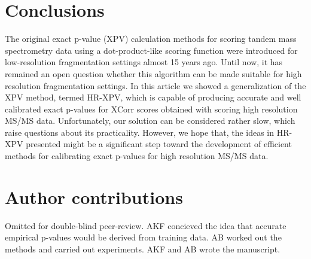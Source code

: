 \documentclass{article}
\begin{document}
%

\section{Conclusions}
The original exact p-value (XPV) calculation methods for scoring tandem mass spectrometry data using a dot-product-like scoring function were introduced for low-resolution fragmentation settings almost 15 years ago. Until now, it has remained an open question whether this algorithm can be made suitable for high resolution fragmentation settings. In this article we showed a generalization of the XPV method, termed HR-XPV, which is capable of producing accurate and well calibrated exact p-values for XCorr scores obtained with scoring high resolution MS/MS data. Unfortunately, our solution can be considered rather slow, which raise questions about its practicality. However, we hope that, the ideas in HR-XPV presented might be a significant step toward the development of efficient methods for calibrating exact p-values for high resolution MS/MS data. 

\section*{Author contributions}
\ifdefined\DOUBLEBLINDREVIEW
Omitted for double-blind peer-review.
\else
AKF concieved the idea that accurate empirical p-values would be derived from training data. AB worked out the methods and carried out experiments. AKF and AB wrote the manuscript.
\fi
\end{document}
